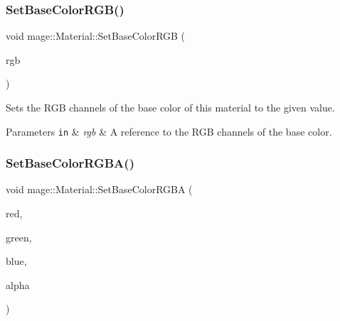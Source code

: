 \subsubsection{\texorpdfstring{Set\+Base\+Color\+R\+G\+B()}{SetBaseColorRGB()}\hspace{0.1cm}{\footnotesize\ttfamily [2/2]}}
{\footnotesize\ttfamily void mage\+::\+Material\+::\+Set\+Base\+Color\+R\+GB (\begin{DoxyParamCaption}\item[{const \hyperlink{structmage_1_1_r_g_b_spectrum}{R\+G\+B\+Spectrum} \&}]{rgb }\end{DoxyParamCaption})\hspace{0.3cm}{\ttfamily [noexcept]}}

Sets the R\+GB channels of the base color of this material to the given value.


\begin{DoxyParams}[1]{Parameters}
\mbox{\tt in}  & {\em rgb} & A reference to the R\+GB channels of the base color. \\
\hline
\end{DoxyParams}
\hypertarget{structmage_1_1_material_a7bc1219bcdd57991abe579e06eb60649}{}\label{structmage_1_1_material_a7bc1219bcdd57991abe579e06eb60649} 
\subsubsection{\texorpdfstring{Set\+Base\+Color\+R\+G\+B\+A()}{SetBaseColorRGBA()}\hspace{0.1cm}{\footnotesize\ttfamily [1/3]}}
{\footnotesize\ttfamily void mage\+::\+Material\+::\+Set\+Base\+Color\+R\+G\+BA (\begin{DoxyParamCaption}\item[{\hyperlink{namespacemage_aa97e833b45f06d60a0a9c4fc22ae02c0}{F32}}]{red,  }\item[{\hyperlink{namespacemage_aa97e833b45f06d60a0a9c4fc22ae02c0}{F32}}]{green,  }\item[{\hyperlink{namespacemage_aa97e833b45f06d60a0a9c4fc22ae02c0}{F32}}]{blue,  }\item[{\hyperlink{namespacemage_aa97e833b45f06d60a0a9c4fc22ae02c0}{F32}}]{alpha }\end{DoxyParamCaption})\hspace{0.3cm}{\ttfamily [noexcept]}}

